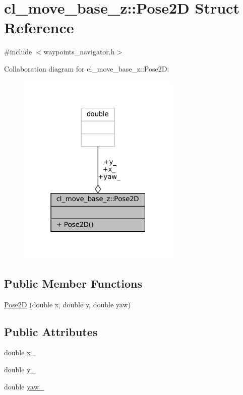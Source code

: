 \hypertarget{structcl__move__base__z_1_1Pose2D}{}\section{cl\+\_\+move\+\_\+base\+\_\+z\+:\+:Pose2D Struct Reference}
\label{structcl__move__base__z_1_1Pose2D}


{\ttfamily \#include $<$waypoints\+\_\+navigator.\+h$>$}



Collaboration diagram for cl\+\_\+move\+\_\+base\+\_\+z\+:\+:Pose2D\+:
\nopagebreak
\begin{figure}[H]
\begin{center}
\leavevmode
\includegraphics[width=220pt]{structcl__move__base__z_1_1Pose2D__coll__graph}
\end{center}
\end{figure}
\subsection*{Public Member Functions}
\begin{DoxyCompactItemize}
\item 
\hyperlink{structcl__move__base__z_1_1Pose2D_ac84fa69c2c2dda7ec107a52e9f2c2fcf}{Pose2D} (double x, double y, double yaw)
\end{DoxyCompactItemize}
\subsection*{Public Attributes}
\begin{DoxyCompactItemize}
\item 
double \hyperlink{structcl__move__base__z_1_1Pose2D_a5cf116d8264305c3cf062e573f218854}{x\+\_\+}
\item 
double \hyperlink{structcl__move__base__z_1_1Pose2D_a745b752ce659fca634aaa386230bb931}{y\+\_\+}
\item 
double \hyperlink{structcl__move__base__z_1_1Pose2D_aed88c69c4fb64fdca72534843de5350e}{yaw\+\_\+}
\end{DoxyCompactItemize}



